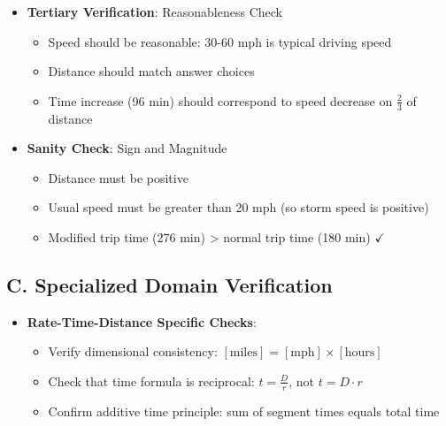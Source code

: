 \documentclass[11pt]{article}
\begin{document}
\begin{verificationbox}
\begin{itemize}[leftmargin=*]
    \item \textbf{Tertiary Verification}: Reasonableness Check
    \begin{itemize}[leftmargin=*]
        \item Speed should be reasonable: 30-60 mph is typical driving speed
        \item Distance should match answer choices
        \item Time increase (96 min) should correspond to speed decrease on $\frac{2}{3}$ of distance
    \end{itemize}
    
    \item \textbf{Sanity Check}: Sign and Magnitude
    \begin{itemize}[leftmargin=*]
        \item Distance must be positive
        \item Usual speed must be greater than 20 mph (so storm speed is positive)
        \item Modified trip time (276 min) > normal trip time (180 min) $\checkmark$
    \end{itemize}
\end{itemize}

\subsection*{C. Specialized Domain Verification}
\begin{itemize}[leftmargin=*]
    \item \textbf{Rate-Time-Distance Specific Checks}:
    \begin{itemize}[leftmargin=*]
        \item Verify dimensional consistency: $[\text{miles}] = [\text{mph}] \times [\text{hours}]$
        \item Check that time formula is reciprocal: $t = \frac{D}{r}$, not $t = D \cdot r$
        \item Confirm additive time principle: sum of segment times equals total time
    \end{itemize}
\end{itemize}


\end{verificationbox}
\end{document}
